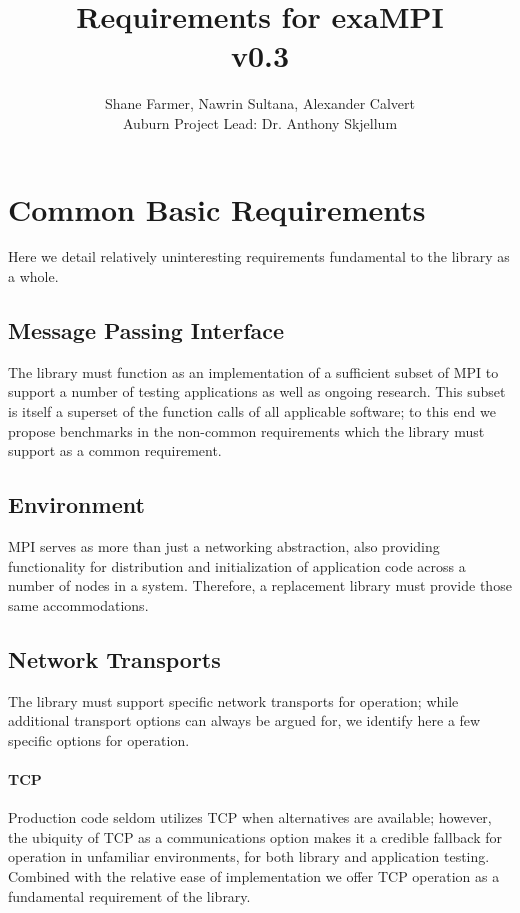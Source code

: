 \documentclass{article}
\title{Requirements for exaMPI\\ v0.3}
\author{Shane Farmer, Nawrin Sultana, Alexander Calvert\\Auburn Project Lead:  Dr. Anthony Skjellum}
\begin{document}
\maketitle
\tableofcontents


\section{Common Basic Requirements}

Here we detail relatively uninteresting requirements fundamental to the library as a whole.

\subsection{Message Passing Interface}

The library must function as an implementation of a sufficient subset of MPI to support a number of testing applications as well as ongoing research.  This subset is itself a superset of the function calls of all applicable software; to this end we propose benchmarks in the non-common requirements which the library must support as a common requirement.

\subsection{Environment}

MPI serves as more than just a networking abstraction, also providing functionality for distribution and initialization of application code across a number of nodes in a system.  Therefore, a replacement library must provide those same accommodations.

\subsection{Network Transports}

The library must support specific network transports for operation; while additional transport options can always be argued for, we identify here a few specific options for operation.

\paragraph{TCP}  Production code seldom utilizes TCP when alternatives are available; however, the ubiquity of TCP as a communications option makes it a credible fallback for operation in unfamiliar environments, for both library and application testing.  Combined with the relative ease of implementation we offer TCP operation as a fundamental requirement of the library.
\end{document}
